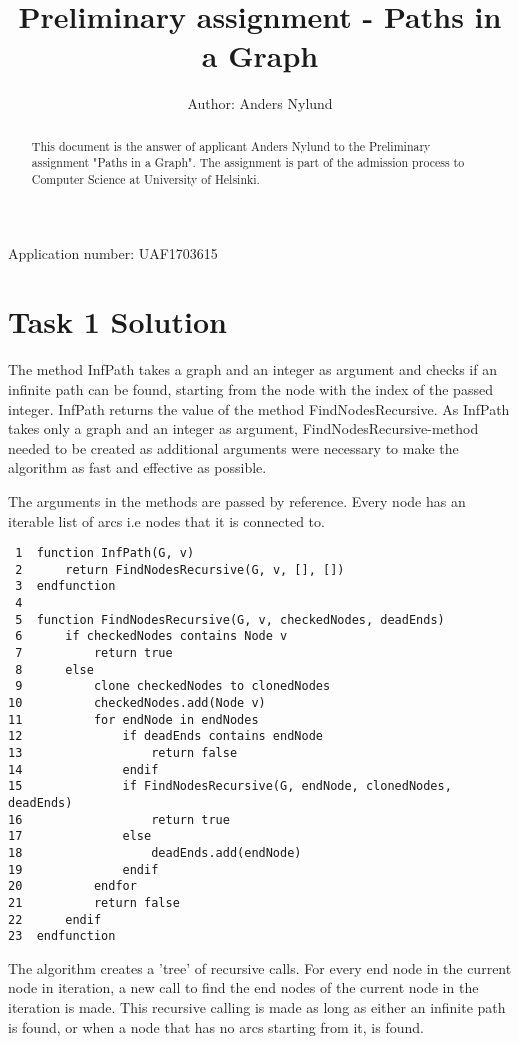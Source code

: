 \documentclass[]{article}
\title{Preliminary assignment - Paths in a Graph}
\author{Author: Anders Nylund}
\begin{document}
\maketitle

\begin{center}
	Application number: UAF1703615
\end{center}

\begin{abstract}
This document is the answer of applicant Anders Nylund to the Preliminary assignment "Paths in a Graph". The assignment is part of the admission process to Computer Science at University of Helsinki.
\end{abstract}

\newpage
\section*{Task 1 Solution}

The method InfPath takes a graph and an integer as argument and checks if an infinite path can be found, starting from the node with the index of the passed integer. InfPath returns the value of the method FindNodesRecursive. As InfPath takes only a graph and an integer as argument, FindNodesRecursive-method needed to be created as additional arguments were necessary to make the algorithm as fast and effective as possible.

The arguments in the methods are passed by reference. Every node has an iterable list of arcs i.e nodes that it is connected to.

\begin{lstlisting}
 1	function InfPath(G, v)
 2		return FindNodesRecursive(G, v, [], [])
 3	endfunction
 4
 5	function FindNodesRecursive(G, v, checkedNodes, deadEnds)
 6		if checkedNodes contains Node v
 7			return true
 8		else
 9			clone checkedNodes to clonedNodes
10			checkedNodes.add(Node v)	
11			for endNode in endNodes
12				if deadEnds contains endNode
13					return false
14				endif
15				if FindNodesRecursive(G, endNode, clonedNodes, deadEnds)
16					return true
17				else
18					deadEnds.add(endNode)
19				endif
20			endfor
21			return false
22		endif
23	endfunction
\end{lstlisting}

The algorithm creates a 'tree' of recursive calls. For every end node in the current node in iteration, a new call to find the end nodes of the current node in the iteration is made. This recursive calling is made as long as either an infinite path is found, or when a node that has no arcs starting from it, is found. 
\end{document}
